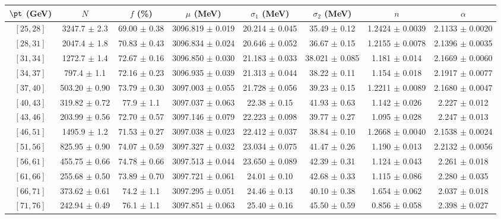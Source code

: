 \begin{tabular}{c||c|c|c|c|c|c|c}
$\pt$ (GeV) & $N$ & $f$ (\%) & $\mu$ (MeV) & $\sigma_1$ (MeV) & $\sigma_2$ (MeV) & $n$ & $\alpha$ \\
\hline
$[25, 28]$ & 3247.7 $\pm$ 2.3 & 69.00 $\pm$ 0.38 & 3096.819 $\pm$ 0.019 & 20.214 $\pm$ 0.045 & 35.49 $\pm$ 0.12 & 1.2424 $\pm$ 0.0039 & 2.1133 $\pm$ 0.0020\\
$[28, 31]$ & 2047.4 $\pm$ 1.8 & 70.83 $\pm$ 0.43 & 3096.834 $\pm$ 0.024 & 20.646 $\pm$ 0.052 & 36.67 $\pm$ 0.15 & 1.2155 $\pm$ 0.0078 & 2.1396 $\pm$ 0.0035\\
$[31, 34]$ & 1272.7 $\pm$ 1.4 & 72.67 $\pm$ 0.16 & 3096.850 $\pm$ 0.030 & 21.183 $\pm$ 0.033 & 38.021 $\pm$ 0.085 & 1.181 $\pm$ 0.014 & 2.1669 $\pm$ 0.0060\\
$[34, 37]$ & 797.4 $\pm$ 1.1 & 72.16 $\pm$ 0.23 & 3096.935 $\pm$ 0.039 & 21.313 $\pm$ 0.044 & 38.22 $\pm$ 0.11 & 1.154 $\pm$ 0.018 & 2.1917 $\pm$ 0.0077\\
$[37, 40]$ & 503.20 $\pm$ 0.90 & 73.79 $\pm$ 0.30 & 3097.003 $\pm$ 0.055 & 21.728 $\pm$ 0.056 & 39.23 $\pm$ 0.15 & 1.2211 $\pm$ 0.0089 & 2.1680 $\pm$ 0.0047\\
$[40, 43]$ & 319.82 $\pm$ 0.72 & 77.9 $\pm$ 1.1 & 3097.037 $\pm$ 0.063 & 22.38 $\pm$ 0.15 & 41.93 $\pm$ 0.63 & 1.142 $\pm$ 0.026 & 2.227 $\pm$ 0.012\\
$[43, 46]$ & 203.99 $\pm$ 0.56 & 72.70 $\pm$ 0.57 & 3097.146 $\pm$ 0.079 & 22.223 $\pm$ 0.098 & 39.77 $\pm$ 0.27 & 1.095 $\pm$ 0.028 & 2.247 $\pm$ 0.013\\
$[46, 51]$ & 1495.9 $\pm$ 1.2 & 71.53 $\pm$ 0.27 & 3097.038 $\pm$ 0.023 & 22.412 $\pm$ 0.037 & 38.84 $\pm$ 0.10 & 1.2668 $\pm$ 0.0040 & 2.1538 $\pm$ 0.0024\\
$[51, 56]$ & 825.95 $\pm$ 0.90 & 74.07 $\pm$ 0.59 & 3097.327 $\pm$ 0.032 & 23.034 $\pm$ 0.075 & 41.47 $\pm$ 0.26 & 1.190 $\pm$ 0.013 & 2.2132 $\pm$ 0.0056\\
$[56, 61]$ & 455.75 $\pm$ 0.66 & 74.78 $\pm$ 0.66 & 3097.513 $\pm$ 0.044 & 23.650 $\pm$ 0.089 & 42.39 $\pm$ 0.31 & 1.124 $\pm$ 0.043 & 2.261 $\pm$ 0.018\\
$[61, 66]$ & 255.68 $\pm$ 0.50 & 73.89 $\pm$ 0.70 & 3097.721 $\pm$ 0.061 & 24.01 $\pm$ 0.10 & 42.68 $\pm$ 0.33 & 1.115 $\pm$ 0.086 & 2.280 $\pm$ 0.035\\
$[66, 71]$ & 373.62 $\pm$ 0.61 & 74.2 $\pm$ 1.1 & 3097.295 $\pm$ 0.051 & 24.46 $\pm$ 0.13 & 40.10 $\pm$ 0.38 & 1.654 $\pm$ 0.062 & 2.037 $\pm$ 0.018\\
$[71, 76]$ & 242.94 $\pm$ 0.49 & 76.1 $\pm$ 1.1 & 3097.851 $\pm$ 0.063 & 25.40 $\pm$ 0.16 & 45.50 $\pm$ 0.59 & 0.856 $\pm$ 0.058 & 2.398 $\pm$ 0.027\\

\end{tabular}
